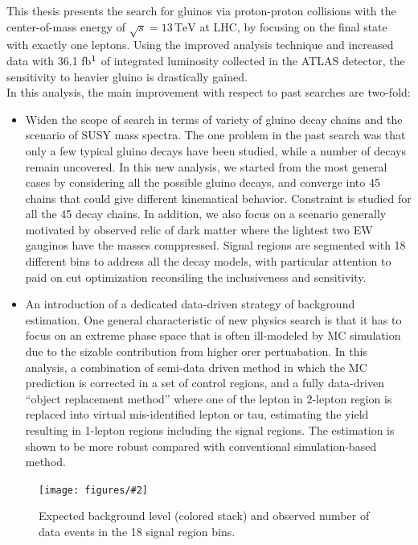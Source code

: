 \documentclass {article}
\newcommand{\tev}{\, \mathrm{TeV}}
\newcommand{\fig}[4][width=15cm]{
	\begin{figure}[H]
		 \centering
			 \texttt{[image: figures/\#2]}
		 \caption{#3}
		 \label{#4}
	 \end{figure}}
\begin{document}
This thesis presents the search for gluinos via proton-proton collisions with the center-of-mass energy of $\sqrt{s}=13\tev$ at LHC, by focusing on the final state with exactly one leptons. 
Using the improved analysis technique and increased data with 36.1 fb$^{\-1}$ of integrated luminosity collected in the ATLAS detector, the sensitivity to heavier gluino is drastically gained.  \\

In this analysis, the main improvement with respect to past searches are two-fold: 
\begin{itemize}
\item Widen the scope of search in terms of variety of gluino decay chains and the scenario of SUSY mass spectra.
The one problem in the past search was that only a few typical gluino decays have been studied, while a number of decays remain uncovered.
In this new analysis, we started from the most general cases by considering all the possible gluino decays, and converge into 45 chains that could give different kinematical behavior.
Constraint is studied for all the 45 decay chains. In addition, we also focus on a scenario generally motivated by observed relic of dark matter where the lightest two EW gauginos have the masses comppressed.
Signal regions are segmented with 18 different bins to address all the decay models, with particular attention to paid on cut optimization reconsiling the inclusiveness and sensitivity. \\


\item An introduction of a dedicated data-driven strategy of background estimation.
One general characteristic of new physics search is that it has to focus on an extreme phase space that is often ill-modeled by MC simulation due to the sizable contribution from higher orer pertuabation.
In this analysis, a combination of semi-data driven method in which the MC prediction is corrected in a set of control regions, and a fully data-driven ``object replacement method'' 
where one of the lepton in 2-lepton region is replaced into virtual mis-identified lepton or tau, estimating the yield resulting in 1-lepton regions including the signal regions.
The estimation is shown to be more robust compared with conventional simulation-based method. \\
\end{itemize}



\fig[160]{histpull_SRs.eps}
{Expected background level (colored stack) and observed number of data events in the 18 signal region bins.}
{SRpull}
\end{document}

